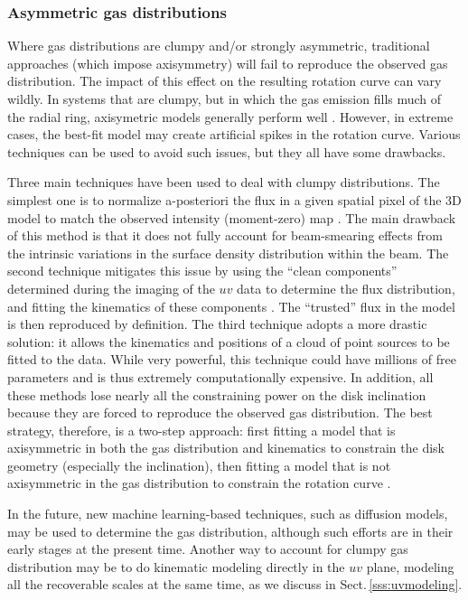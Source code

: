 \documentclass[a4paper,11pt]{article}
\begin{document}
\subsubsection{Asymmetric gas distributions}\label{sec:clumpy}

Where gas distributions are clumpy and/or strongly asymmetric, traditional approaches (which impose axisymmetry) will fail to reproduce the observed gas distribution. The impact of this effect on the resulting rotation curve can vary wildly. In systems that are clumpy, but in which the gas emission fills much of the radial ring, axisymetric models generally perform well \citep[e.g.,][]{Davis2014}. However, in extreme cases, the best-fit model may create artificial spikes in the rotation curve. Various techniques can be used to avoid such issues, but they all have some drawbacks.

Three main techniques have been used to deal with clumpy distributions. The simplest one is to normalize a-posteriori the flux in a given spatial pixel of the 3D model to match the observed intensity (moment-zero) map \citep{Lelli2012a}. The main drawback of this method is that it does not fully account for beam-smearing effects from the intrinsic variations in the surface density distribution within the beam. The second technique mitigates this issue by using the ``clean components'' determined during the imaging of the $uv$ data to determine the flux distribution, and fitting the kinematics of these components \citep{Smith2019}. The ``trusted'' flux in the model is then reproduced by definition. The third technique adopts a more drastic solution: it  allows the kinematics and positions of a cloud of point sources to be fitted to the data. While very powerful, this technique could have millions of free parameters and is thus extremely computationally expensive. In addition, all these methods lose nearly all the constraining power on the disk inclination because they are forced to reproduce the observed gas distribution. The best strategy, therefore, is a two-step approach: first fitting a model that is axisymmetric in both the gas distribution and kinematics to constrain the disk geometry (especially the inclination), then fitting a model that is not axisymmetric in the gas distribution to constrain the rotation curve \citep[e.g.,][]{Lelli2012a}.

In the future, new machine learning-based techniques, such as diffusion models, may be used to determine the gas distribution, although such efforts are in their early stages at the present time. Another way to account for clumpy gas distribution may be to do kinematic modeling directly in the $uv$ plane, modeling all the recoverable scales at the same time, as we discuss in Sect.\,\ref{sss:uvmodeling}.
\end{document}

